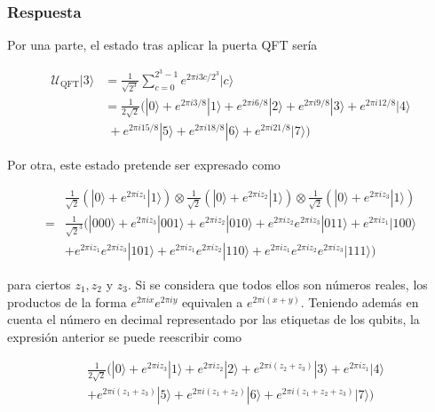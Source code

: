 \documentclass{article}
\begin{document}
\subsubsection*{Respuesta}

Por una parte, el estado tras aplicar la puerta QFT sería 

\begin{align*}
  \mathcal{U}_\text{QFT}|3\rangle 
  &= \frac{1}{\sqrt{2^3}} 
    \sum_{c=0}^{2^3 - 1} e^{2\pi i 3 c / 2^3} |c\rangle \\ 
  &= \frac{1}{2\sqrt{2}}\Big(
      |0\rangle 
      + e^{2\pi i 3/8}|1\rangle 
      + e^{2\pi i 6/8}|2\rangle 
      + e^{2\pi i 9/8}|3\rangle 
      + e^{2\pi i 12/8}|4\rangle \\
      &\;+ e^{2\pi i 15/8}|5\rangle 
      + e^{2\pi i 18/8}|6\rangle 
      + e^{2\pi i 21/8}|7\rangle 
    \Big)
\end{align*}

Por otra, este estado pretende ser expresado como 

\begin{align*}
  &\frac{1}{\sqrt{2}}(|0\rangle + e^{2\pi i z_1}|1\rangle)
    \otimes \frac{1}{\sqrt{2}}(|0\rangle + e^{2\pi i z_2}|1\rangle)
    \otimes \frac{1}{\sqrt{2}}(|0\rangle + e^{2\pi i z_3}|1\rangle)
    \\
  = &\frac{1}{\sqrt{2}^3}\Big(
      |000\rangle
      + e^{2\pi i z_3}|001\rangle 
      + e^{2\pi i z_2}|010\rangle 
      + e^{2\pi i z_2}e^{2\pi i z_3}|011\rangle 
      + e^{2\pi i z_1}|100\rangle \\ 
      &+ e^{2\pi i z_1}e^{2\pi i z_3}|101\rangle 
      + e^{2\pi i z_1}e^{2\pi i z_2}|110\rangle 
      + e^{2\pi i z_1}e^{2\pi i z_2}e^{2\pi i z_3}|111\rangle 
    \Big) 
\end{align*}

para ciertos $z_1, z_2$ y $z_3$. Si se considera que todos ellos son
números reales, los productos de la forma $e^{2\pi i x}e^{2\pi i y}$
equivalen a $e^{2\pi i (x + y)}$. Teniendo además en cuenta el
número en decimal representado por las etiquetas de los qubits, la
expresión anterior se puede reescribir como

\begin{align*}
  &\frac{1}{2\sqrt{2}}\Big(
      |0\rangle
      + e^{2\pi i z_3}|1\rangle 
      + e^{2\pi i z_2}|2\rangle 
      + e^{2\pi i (z_2 + z_3)}|3\rangle 
      + e^{2\pi i z_1}|4\rangle \\ 
      &+ e^{2\pi i (z_1 + z_3)}|5\rangle 
      + e^{2\pi i (z_1 + z_2)}|6\rangle 
      + e^{2\pi i (z_1 + z_2 + z_3)}|7\rangle 
    \Big) 
\end{align*}
\end{document}
